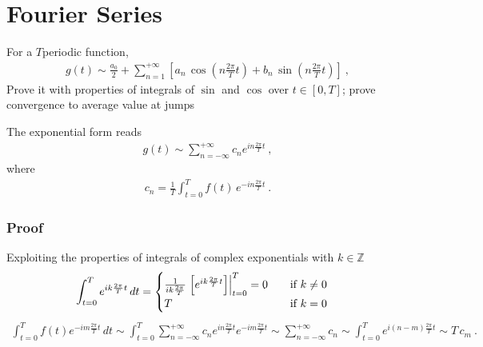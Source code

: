 \documentclass[letterpaper,10pt,english]{jupyterBook}
\begin{document}
\section{Fourier Series}
\label{\detokenize{ch/complex/fourier:fourier-series}}\label{\detokenize{ch/complex/fourier:complex-fourier-fs}}
\sphinxAtStartPar
For a \(T\)\sphinxhyphen{}periodic function,
\begin{equation*}
\begin{split}g(t) \sim \frac{a_0}{2} + \sum_{n=1}^{+\infty} \left[ a_n \, \cos\left( n \frac{2\pi}{T} t \right) + b_n \, \sin\left( n \frac{2 \pi }{T} t \right) \right] \ ,\end{split}
\end{equation*}
\sphinxAtStartPar
{} Prove it with properties of integrals of \(\sin\) and \(\cos\) over \(t \in \left[ 0, T \right]\); prove convergence to average value at jumps

\sphinxAtStartPar
The exponential form reads
\begin{equation}\label{equation:ch/complex/fourier:eq:fourier-series:exp}
\begin{split}g(t) \sim \sum_{n=-\infty}^{+\infty} c_n e^{i n \frac{2 \pi }{T}t} \ ,\end{split}
\end{equation}
\sphinxAtStartPar
where
\begin{equation}\label{equation:ch/complex/fourier:eq:fourier-series:exp:coeff}
\begin{split}c_n = \frac{1}{T} \int_{t=0}^{T} f(t) \, e^{-i n \frac{2\pi}{T} t} \ .\end{split}
\end{equation}\subsubsection*{Proof}

\sphinxAtStartPar
Exploiting the properties of integrals of complex exponentials with \(k \in \mathbb{Z}\)
\begin{equation*}
\begin{split}\int_{t=0}^{T} e^{i k \frac{2 \pi}{T} t} \, dt = 
\begin{cases}
\frac{1}{i k \frac{2 \pi}{T}} \left.\left[ e^{ik \frac{2\pi}{T} t} \right]\right|_{t=0}^{T} = 0 \hfill \qquad \text{if $ k \ne 0$} \\
T \hfill \text{if $ k = 0$}
\end{cases}
\end{split}
\end{equation*}\begin{equation*}
\begin{split}\int_{t=0}^{T} f(t) e^{-i m \frac{2 \pi}{T} t} \, dt
 \sim \int_{t=0}^{T} \sum_{n=-\infty}^{+\infty} c_n e^{i n \frac{2 \pi }{T}t}  e^{-i m \frac{2 \pi}{T} t}
 \sim \sum_{n=-\infty}^{+\infty} c_n \sim \int_{t=0}^{T} e^{i (n-m) \frac{2 \pi }{T}t} 
 \sim T \, c_m \ .
\end{split}
\end{equation*}
\end{document}
